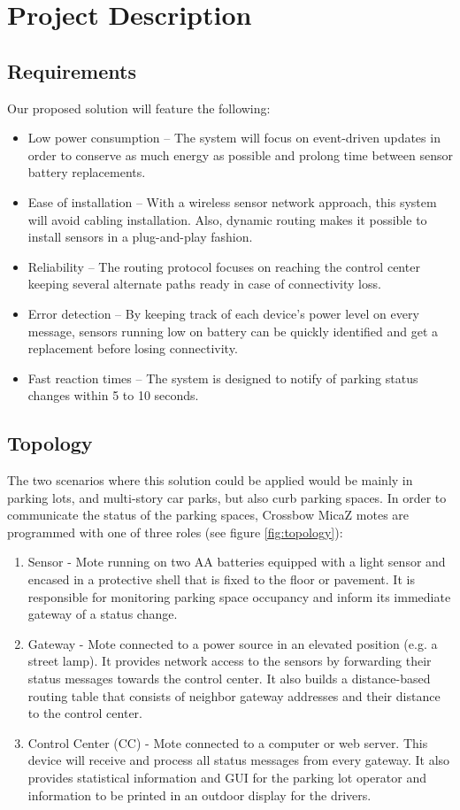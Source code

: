 \chapter{Project Description}
\label{project_description}

\section{Requirements}
\noindent Our proposed solution will feature the following: 
\begin{itemize}[noitemsep]
	\item Low power consumption – The system will focus on event-driven updates in order to conserve as much energy as possible and prolong time between sensor battery replacements.
	\item Ease of installation – With a wireless sensor network approach, this system will avoid cabling installation. Also, dynamic routing makes it possible to install sensors in a plug-and-play fashion.
	\item Reliability – The routing protocol focuses on reaching the control center keeping several alternate paths ready in case of connectivity loss.
	\item Error detection – By keeping track of each device's power level on every message, sensors running low on battery can be quickly identified and get a replacement before losing connectivity.
	\item Fast reaction times – The system is designed to notify of parking status changes within 5 to 10 seconds.
\end{itemize}

\section{Topology}
The two scenarios where this solution could be applied would be mainly in parking lots, and multi-story car parks, but also curb parking spaces.
In order to communicate the status of the parking spaces, Crossbow MicaZ motes are programmed with one of three roles (see figure \ref{fig:topology}):
\begin{enumerate}
	\item Sensor - Mote running on two AA batteries equipped with a light sensor and encased in a protective shell that is fixed to the floor or pavement.
	It is responsible for monitoring parking space occupancy and inform its immediate gateway of a status change.
	\item Gateway - Mote connected to a power source in an elevated position (e.g. a street lamp). 
	It provides network access to the sensors by forwarding their status messages towards the control center. 
	It also builds a distance-based routing table that consists of neighbor gateway addresses and their distance to the control center.
	\item Control Center (CC) - Mote connected to a computer or web server. This device will receive and process all status messages from every gateway. 
	It also provides statistical information and GUI for the parking lot operator and information to be printed in an outdoor display for the drivers.
\end{enumerate}

